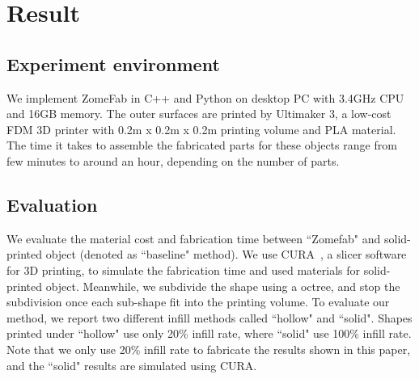 \section{Result}
\label{sec:result}

\subsection{Experiment environment}
We implement ZomeFab in C++ and Python on desktop PC with 3.4GHz CPU and 16GB memory. 
The outer surfaces are printed by Ultimaker 3, a low-cost FDM 3{D} printer with 0.2m x 0.2m x 0.2m printing volume and PLA material. 
The time it takes to assemble the fabricated parts for these objects range from few minutes to around an hour, depending on the number of parts.

\subsection{Evaluation}
We evaluate the material cost and fabrication time between ``Zomefab" and solid-printed object (denoted as ``baseline" method).
We use CURA~\cite{}, a slicer software for 3{D} printing, to simulate the fabrication time and used materials for solid-printed object.
Meanwhile, we subdivide the shape using a octree, and stop the subdivision once each sub-shape fit into the printing volume.
To evaluate our method, we report two different infill methods called ``hollow" and ``solid".
Shapes printed under ``hollow" use only 20\% infill rate, where ``solid" use 100\% infill rate.
Note that we only use 20\% infill rate to fabricate the results shown in this paper, and the ``solid" results are simulated using CURA.

